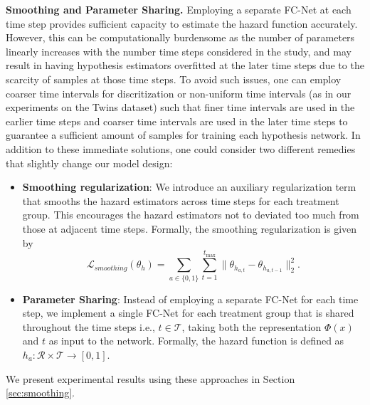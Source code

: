 \documentclass{article}
\newcommand{\Tc}{{\mathcal T}}
\newcommand{\loss}{{\mathcal L}}
\newcommand{\minus}{{-}} %
\newcommand{\tmax}{{t_{\text{max}}}}
\begin{document}
\textbf{Smoothing and Parameter Sharing.}
Employing a separate FC-Net at each time step provides sufficient capacity to estimate the hazard function accurately. However, this can be computationally burdensome as the number of parameters linearly increases with the number time steps considered in the study, and may result in having hypothesis estimators overfitted at the later time steps due to the scarcity of samples at those time steps. To avoid such issues, one can employ coarser time intervals for discritization or non-uniform time intervals (as in our experiments on the Twins dataset) such that finer time intervals are used in the earlier time steps and coarser time intervals are used in the later time steps to guarantee a sufficient amount of samples for training each hypothesis network. In addition to these immediate solutions, one could consider two different remedies that slightly change our model design:

\begin{itemize}[leftmargin=5.5mm]
    \item \textbf{Smoothing regularization}: We introduce an auxiliary regularization term that smooths the hazard estimators across time steps for each treatment group. This encourages the hazard estimators not to deviated too much from those at adjacent time steps. %
    Formally, the smoothing regularization is given by
    \begin{equation} \nonumber
        \loss_{smoothing}(\theta_{h}) = \sum_{a\in\{0,1\}} \sum_{t=1}^{\tmax} \| \theta_{h_{a,t}} - \theta_{h_{a,t
        \minus 1}}\|_{2}^{2}.
    \end{equation}
    \item \textbf{Parameter Sharing}: Instead of employing a separate FC-Net for each time step, we implement a single FC-Net for each treatment group that is shared throughout the time steps i.e., $t \in \Tc$, taking both the representation $\Phi(x)$ and $t$ as input to the network. Formally, the hazard function is defined as $h_{a}: \mathcal{R} \times \Tc \rightarrow [0,1]$.
\end{itemize}
We present experimental results using these approaches in Section \ref{sec:smoothing}.
\end{document}
